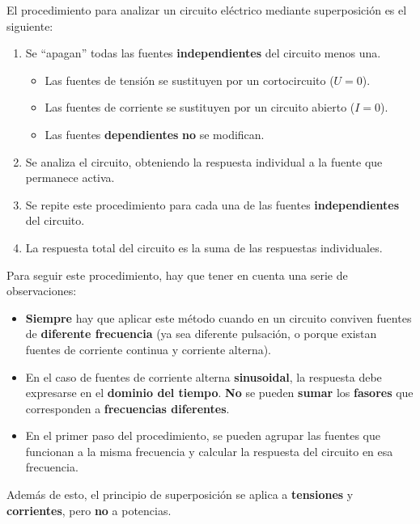 \documentclass[11pt]{book} %
\numberwithin{dummy}{section}
\theoremstyle{ocrenumbox}
\theoremstyle{blacknumex}
\theoremstyle{blacknumbox}
\theoremstyle{ocrenum}
\newlength\esp
\begin{document}
El procedimiento para analizar un circuito eléctrico mediante superposición es el siguiente: 
\begin{enumerate}
\item Se ``apagan'' todas las fuentes \textbf{independientes} del circuito menos una.
    \begin{itemize}
    \item Las fuentes de tensión se sustituyen por un cortocircuito ($U = 0$).
    \item Las fuentes de corriente se sustituyen por un circuito abierto ($I = 0$).
    \item Las fuentes \textbf{dependientes} \textbf{no} se modifican.
    \end{itemize}
\item Se analiza el circuito, obteniendo la respuesta individual a la fuente que permanece activa.
\item Se repite este procedimiento para cada una de las fuentes \textbf{independientes} del circuito.
\item La respuesta total del circuito es la suma de las respuestas individuales.
\end{enumerate}

Para seguir este procedimiento, hay que tener en cuenta una serie de observaciones: 
\begin{itemize}
\item \textbf{Siempre} hay que aplicar este método cuando en un circuito conviven fuentes de \textbf{diferente frecuencia} (ya sea diferente pulsación, o porque existan fuentes de corriente continua y corriente alterna).
\item En el caso de fuentes de corriente alterna \textbf{sinusoidal}, la respuesta debe expresarse en el \textbf{dominio del tiempo}. \textbf{No} se pueden \textbf{sumar} los \textbf{fasores} que corresponden a \textbf{frecuencias diferentes}.
\item En el primer paso del procedimiento, se pueden agrupar las fuentes que funcionan a la misma frecuencia y calcular la respuesta del circuito en esa frecuencia.
\end{itemize}

Además de esto, el principio de superposición se aplica a \textbf{tensiones} y \textbf{corrientes}, pero \textbf{no} a potencias. 
\end{document}
